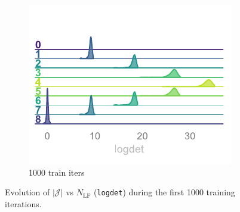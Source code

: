 \documentclass[a4paper,11pt]{article}
\begin{document}
\begin{figure}[htpb!]
\begin{subfigure}{0.31\textwidth}
    \end{subfigure}
    \hfill
    \begin{subfigure}{0.31\textwidth}
        \includegraphics[width=\textwidth]{assets/logdet-3.pdf}
        \caption{\label{subfig:logdet3} 1000 train iters}
    \end{subfigure}
    \caption{\label{fig:logdet}Evolution of $\left|\mathcal{J}\right|$ vs $N_{\mathrm{LF}}$ (\texttt{logdet}) during the first 1000 training iterations.}
\end{figure}
%
%  
\end{document}
